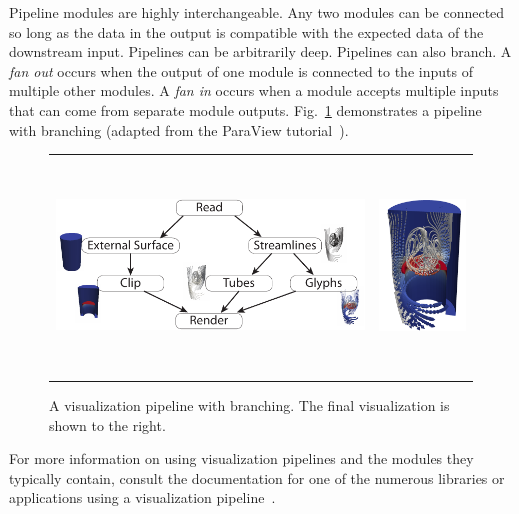 \documentclass[journal,onecolumn,12pt,letterpaper,twoside]{IEEEtran}
\newcommand*{\lcite}[1]{~\cite{#1}}
\newcommand*{\figref}[1]{Fig.~\ref{#1}}
\newcommand*{\keyterm}[1]{\emph{#1}}
\begin{document}
Pipeline modules are highly interchangeable.  Any two modules can be
connected so long as the data in the output is compatible with the expected
data of the downstream input.  Pipelines can be arbitrarily deep.
Pipelines can also branch.  A \keyterm{fan out} occurs when the output of
one module is connected to the inputs of multiple other modules.  A
\keyterm{fan in} occurs when a module accepts multiple inputs that can
come from separate module outputs.  \figref{fig:BranchingPipeline}
demonstrates a pipeline with branching (adapted from the ParaView
tutorial\lcite{ParaViewTutorial}).

\begin{figure}[htbp]
  \centering
  \begin{tabular}{cc}
    \includegraphics[height=2.25in]{images/BranchingPipeline} &
    \includegraphics[height=2.25in]{images/BranchingPipelineResult}
  \end{tabular}
  \caption{A visualization pipeline with branching.  The final
    visualization is shown to the right.}
  \label{fig:BranchingPipeline}
\end{figure}

For more information on using visualization pipelines and the modules
they typically contain, consult the documentation for one of the numerous
libraries or applications using a visualization
pipeline\lcite{VTK,ParaView,ParaViewTutorial,SCIRunUserGuide,IRISExplorerUsersGuide,VisTrailsDocumentation,OpenDXGuide}.
\end{document}
